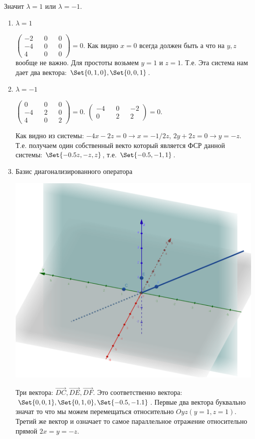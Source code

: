 \begin{enumerate}
	Значит $\lambda = 1$ или $\lambda = -1$.

	\begin{enumerate}
		\item $\lambda = 1$
		
		$
		\begin{pmatrix}
			-2 && 0 && 0\\
			-4 && 0&& 0\\
			4 && 0 && 0
		   \end{pmatrix} = 0.
		$
		Как видно $x = 0$ всегда должен быть а что на $y,z$ вообще не важно.
		 Для простоты возьмем $y = 1$ и $z = 1$. Т.е. Эта система нам дает два вектора: $\Set{0,1,0}, \Set{0,0,1}$.
		
		\item $\lambda = -1$
		
		$
		\begin{pmatrix}
			0 && 0 && 0\\
			-4 && 2 && 0\\
			4 && 0 && 2
		   \end{pmatrix} = 0.
		$	
		$
		\begin{pmatrix}
			-4 && 0 && -2\\
			0 && 2 && 2
		   \end{pmatrix} = 0.
		$

		Как видно из системы: $-4x -2z = 0 \rightarrow x = -1/2z$, 
		$2y+2z=0 \rightarrow y=-z$. Т.е. получаем один собственный векто который является ФСР данной системы: $\Set{-0.5z,-z,z}$, т.е. $\Set{-0.5,-1,1}$.
		
		\item Базис диагонализированного оператора
		
		\includegraphics[scale=0.2]{ss5.png}

		Три вектора: $\vec{DC}, \vec{DE}, \vec{DF}$.
		Это соответственно вектора: $\Set{0,0,1}, \Set{0,1,0}, \Set{-0.5,-1.1}$. Первые два вектора буквально значат то что мы можем перемещаться относительно $Oyz (y = 1, z = 1)$. Третий же вектор и означает то самое параллельное отражение относительно прямой $2x=y=-z$.

	\end{enumerate}

\end{enumerate}